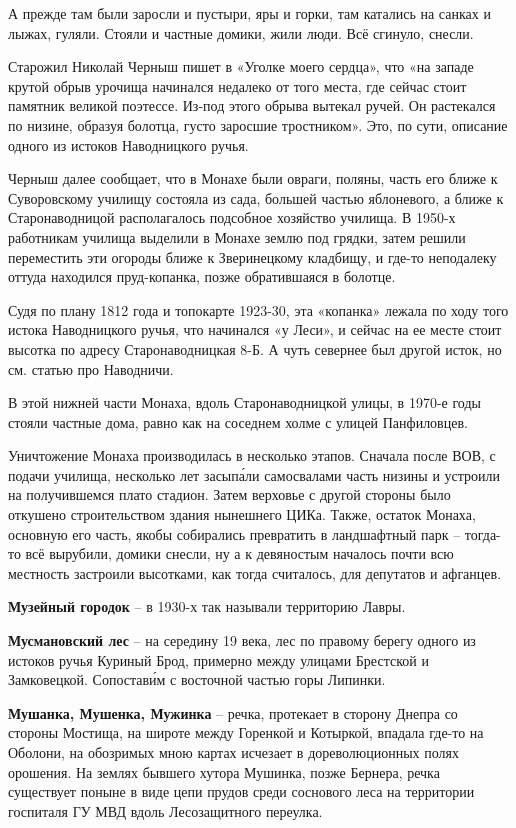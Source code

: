 А прежде там были заросли и пустыри, яры и горки, там катались на санках и лыжах, гуляли. Стояли и частные домики, жили люди. Всё сгинуло, снесли.

Старожил Николай Черныш пишет в «Уголке моего сердца», что «на западе крутой обрыв урочища начинался недалеко от того места, где сейчас стоит памятник великой поэтессе. Из-под этого обрыва вытекал ручей. Он растекался по низине, образуя болотца, густо заросшие тростником». Это, по сути, описание одного из истоков Наводницкого ручья.

Черныш далее сообщает, что в Монахе были овраги, поляны, часть его ближе к Суворовскому училищу состояла из сада, большей частью яблоневого, а ближе к Старонаводницой располагалось подсобное хозяйство училища. В 1950-х работникам училища выделили в Монахе землю под грядки, затем решили переместить эти огороды ближе к Зверинецкому кладбищу, и где-то неподалеку оттуда находился пруд-копанка, позже обратившаяся в болотце. 

Судя по плану 1812 года и топокарте 1923-30, эта «копанка» лежала по ходу того истока Наводницкого ручья, что начинался «у Леси», и сейчас на ее месте стоит высотка по адресу Старонаводницкая 8-Б. А чуть севернее был другой исток, но см. статью про Наводничи.

В этой нижней части Монаха, вдоль Старонаводницкой улицы, в 1970-е годы стояли частные дома, равно как на соседнем холме с улицей Панфиловцев. 

Уничтожение Монаха производилась в несколько этапов. Сначала после ВОВ, с подачи училища, несколько лет засып\'али самосвалами часть низины и устроили на получившемся плато стадион. Затем верховье с другой стороны было откушено строительством здания нынешнего ЦИКа. Также, остаток Монаха, основную его часть, якобы собирались превратить в ландшафтный парк – тогда-то всё вырубили, домики снесли, ну а к девяностым началось почти всю местность застроили высотками, как тогда считалось, для депутатов и афганцев.

\medskip

\textbf{Музейный городок} – в 1930-х так называли территорию Лавры.\\

\medskip

\textbf{Мусмановский лес} – на середину 19 века, лес по правому берегу одного из истоков ручья Куриный Брод, примерно между улицами Брестской и Замковецкой. Сопостав\'им с восточной частью горы Липинки.\\

\medskip

\textbf{Мушанка, Мушенка, Мужинка} – речка, протекает в сторону Днепра со стороны Мостища, на широте между Горенкой и Котыркой, впадала где-то на Оболони, на обозримых мною картах исчезает в дореволюционных полях орошения. На землях бывшего хутора Мушинка, позже Бернера, речка существует поныне в виде цепи прудов среди соснового леса на территории госпиталя ГУ МВД вдоль Лесозащитного переулка.

